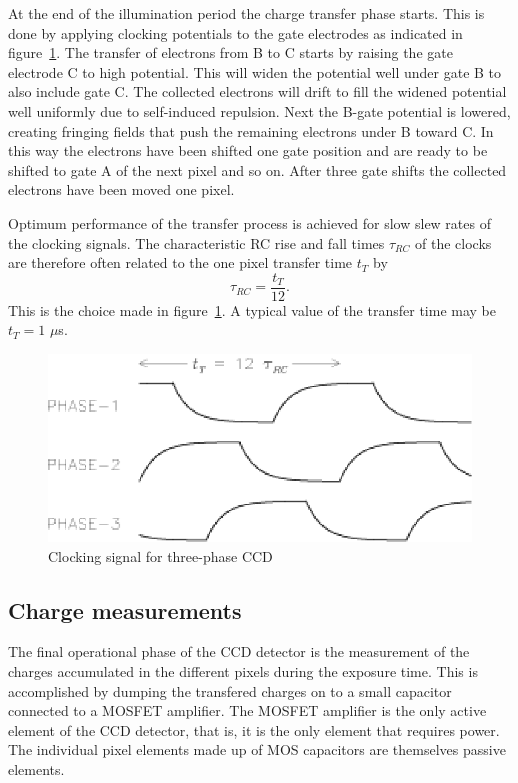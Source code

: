 At the end of the illumination period the charge transfer phase
starts. This is done by applying clocking potentials to the gate
electrodes as indicated in figure~\ref{CCD.figclocking}. The transfer
of electrons from B to C starts by raising the gate electrode C to
high potential. This will widen the potential well under gate B to
also include gate C. The collected electrons will drift to fill the
widened potential well uniformly due to self-induced repulsion. Next
the B-gate potential is lowered, creating fringing fields that push
the remaining electrons under B toward C. In this way the electrons
have been shifted one gate position and are ready to be shifted to
gate A of the next pixel and so on. After three gate shifts the
collected electrons have been moved one pixel.

Optimum performance of the transfer process is achieved for slow slew
rates of the clocking signals. The characteristic RC rise and fall times
 $\tau_{RC}$ of the clocks are therefore often related to the one pixel
transfer time $t_T$ by
\begin{equation}
  \tau_{RC} = \frac{t_T}{12}.
\end{equation}
This is the choice made in figure~\ref{CCD.figclocking}. A typical
value of the transfer time may be $t_T = 1$ $\mu$s.

\begin{figure}[h]
  \centering
	\includegraphics{CCD_clocking.eps}
  \caption{Clocking signal for three-phase CCD}
  \label{CCD.figclocking}
\end{figure}


\subsection{Charge measurements} 

The final operational phase of the CCD detector is the measurement of
the charges accumulated in the different pixels during the exposure
time. This is accomplished by dumping the transfered charges on to a
small capacitor connected to a MOSFET amplifier. The MOSFET amplifier
is the only active element of the CCD detector, that is, it is the
only element that requires power. The individual pixel elements made
up of MOS capacitors are themselves passive elements.

